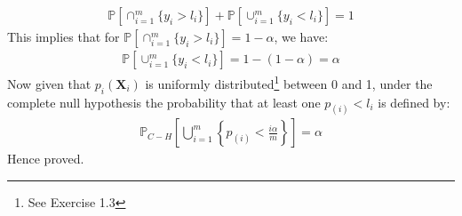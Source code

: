 \documentclass[a4paper, 11pt]{article}
\begin{document}
\begin{eqnarray}
\mathbb{P} [ \cap_{i=1}^{m} \{y_i > l_i \} ] + \mathbb{P} [ \cup_{i=1}^{m} \{y_i < l_i \} ]  = 1\nonumber
\end{eqnarray}
This implies that for $\mathbb{P} [ \cap_{i=1}^{m} \{y_i > l_i \} ] = 1-\alpha$, we have:
\begin{eqnarray}
\mathbb{P} [ \cup_{i=1}^{m} \{y_i < l_i \} ] = 1 - (1-\alpha) = \alpha \nonumber
\end{eqnarray}
Now given that $p_i (\mathbf{X}_i)$ is uniformly distributed\footnote{See Exercise 1.3} between 0 and 1, under the complete null hypothesis the probability that at least one $p_{(i)} < l_i$ is defined by:
\begin{eqnarray}
\mathbb{P}_{C-H} \left[ \bigcup_{i=1}^{m} \left\{p_{(i)} < \frac{i \alpha}{m} \right\} \right] = \alpha \nonumber
\end{eqnarray}
Hence proved.
\end{document}
